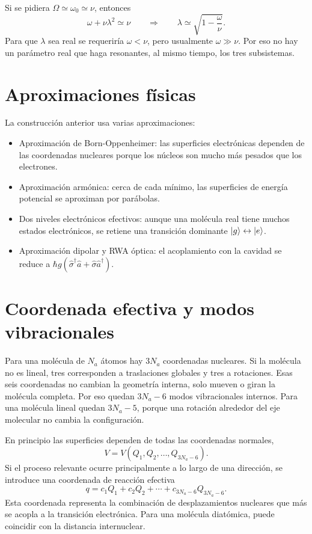 \documentclass[11pt]{article}
\newcommand{\adag}{\hat a^\dagger}
\newcommand{\sigmad}{\hat\sigma^\dagger}
\begin{document}
Si se pidiera $\Omega\simeq\omega_0\simeq\nu$, entonces
\begin{equation}
  \omega+\nu\lambda^2\simeq\nu
  \qquad\Rightarrow\qquad
  \lambda\simeq\sqrt{1-\frac{\omega}{\nu}}.
\end{equation}
Para que $\lambda$ sea real se requerir\'ia $\omega<\nu$, pero usualmente
$\omega\gg\nu$. Por eso no hay un par\'ametro real que haga resonantes, al
mismo tiempo, los tres subsistemas.

\section{Aproximaciones f\'isicas}

La construcci\'on anterior usa varias aproximaciones:
\begin{itemize}
  \item Aproximaci\'on de Born-Oppenheimer: las superficies electr\'onicas
  dependen de las coordenadas nucleares porque los n\'ucleos son mucho m\'as
  pesados que los electrones.
  \item Aproximaci\'on arm\'onica: cerca de cada m\'inimo, las superficies de
  energ\'ia potencial se aproximan por par\'abolas.
  \item Dos niveles electr\'onicos efectivos: aunque una mol\'ecula real tiene
  muchos estados electr\'onicos, se retiene una transici\'on dominante
  $\ket{g}\leftrightarrow\ket{e}$.
  \item Aproximaci\'on dipolar y RWA \'optica: el acoplamiento con la cavidad se
  reduce a $\hbar g(\sigmad\hat a+\hat\sigma\adag)$.
\end{itemize}

\section{Coordenada efectiva y modos vibracionales}

Para una mol\'ecula de $N_a$ \'atomos hay $3N_a$ coordenadas nucleares. Si la
mol\'ecula no es lineal, tres corresponden a traslaciones globales y tres a
rotaciones. Esas seis coordenadas no cambian la geometr\'ia interna, solo
mueven o giran la mol\'ecula completa. Por eso quedan $3N_a-6$ modos
vibracionales internos. Para una mol\'ecula lineal quedan $3N_a-5$, porque una
rotaci\'on alrededor del eje molecular no cambia la configuraci\'on.

En principio las superficies dependen de todas las coordenadas normales,
\begin{equation}
  V=V(Q_1,Q_2,\ldots,Q_{3N_a-6}).
\end{equation}
Si el proceso relevante ocurre principalmente a lo largo de una direcci\'on, se
introduce una coordenada de reacci\'on efectiva
\begin{equation}
  q=c_1Q_1+c_2Q_2+\cdots+c_{3N_a-6}Q_{3N_a-6}.
\end{equation}
Esta coordenada representa la combinaci\'on de desplazamientos nucleares que
m\'as se acopla a la transici\'on electr\'onica. Para una mol\'ecula diat\'omica,
puede coincidir con la distancia internuclear.
\end{document}
